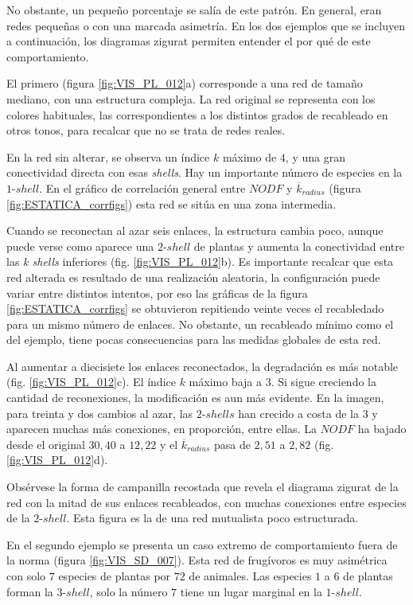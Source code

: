 No obstante, un pequeño porcentaje se salía de este patrón. En general, eran redes pequeñas o con una marcada asimetría. En los dos ejemplos que se incluyen a continuación, los diagramas zigurat permiten entender el por qué de este comportamiento.

El primero (figura \ref{fig:VIS_PL_012}a) corresponde a una red de tamaño mediano, con una estructura compleja. La red original se representa con los colores habituales, las correspondientes a los distintos grados de recableado en otros tonos, para recalcar que no se trata de redes reales. 

En la red sin alterar, se observa un índice $k$ máximo de $4$, y una gran conectividad directa con esas \textit{shells}. Hay un importante número de especies en la $1$-$shell$. En el gráfico de correlación general entre $NODF$ y $\overline k_{radius}$ (figura \ref{fig:ESTATICA_corrfigs}) esta red se sitúa en una zona intermedia.

Cuando se reconectan al azar seis enlaces, la estructura cambia poco, aunque puede verse como aparece una $2$-$shell$ de plantas y aumenta la conectividad entre las \textit{k shells} inferiores (fig. \ref{fig:VIS_PL_012}b). Es importante recalcar que esta red alterada es resultado de una realización aleatoria, la configuración puede variar entre distintos intentos, por eso las gráficas de la figura \ref{fig:ESTATICA_corrfigs} se obtuvieron repitiendo veinte veces el recabledado para un mismo número de enlaces. No obstante, un recableado mínimo como el del ejemplo, tiene pocas consecuencias para las medidas globales de esta red.

Al aumentar a diecisiete los enlaces reconectados, la degradación es más notable (fig. \ref{fig:VIS_PL_012}c). El índice $k$ máximo baja a $3$. Si sigue creciendo la cantidad de reconexiones, la modificación es aun más evidente. En la imagen, para treinta y dos cambios al azar, las $2$-$shells$ han crecido a costa de la $3$ y aparecen muchas más conexiones, en proporción, entre ellas. La $NODF$ ha bajado desde el original $30,40$ a $12,22$ y el $\overline k_{radius}$ pasa de $2,51$ a $2,82$ (fig. \ref{fig:VIS_PL_012}d).

Obsérvese la forma de campanilla recostada que revela el diagrama zigurat de la red con la mitad de sus enlaces recableados, con  muchas conexiones entre especies de la $2$-$shell$. Esta figura es la de una red mutualista poco estructurada.

En el segundo ejemplo se presenta un caso extremo de comportamiento fuera de la norma  (figura \ref{fig:VIS_SD_007}). Esta red de frugívoros es muy asimétrica con solo $7$ especies de plantas por $72$ de animales. Las especies $1$ a $6$ de plantas forman la $3$-$shell$, solo la número $7$ tiene un lugar marginal en la $1$-$shell$.


